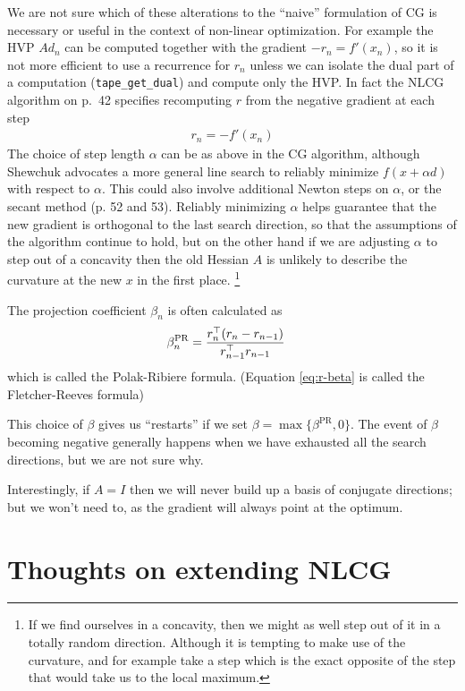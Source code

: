 \documentclass[11pt]{article}
\newcommand{\T}{\top}
\renewcommand{\(}{\left(}
\renewcommand{\)}{\right)}
\begin{document}
We are not sure which of these alterations to the ``naive''
formulation of CG is necessary or useful in the context of non-linear
optimization. For example the HVP $A d_n$ can be computed together with
the gradient $-r_n=f'(x_n)$, so it is not more efficient to use a
recurrence for $r_n$ unless we can isolate the dual part of a
computation (\verb|tape_get_dual|) and compute only the HVP. In fact
the NLCG algorithm on p.~42 specifies recomputing $r$ from the
negative gradient at each step
\begin{align}
r_n = -f'(x_n)
\end{align}
The choice of step length $\alpha$ can be as above in the CG
algorithm, although Shewchuk advocates a more general line search to
reliably minimize $f(x+\alpha d)$ with respect to $\alpha$. This could
also involve additional Newton steps on $\alpha$, or the secant method
(p. 52 and 53). Reliably minimizing $\alpha$ helps guarantee that the
new gradient is orthogonal to the last search direction, so that the
assumptions of the algorithm continue to hold, but on the other hand
if we are adjusting $\alpha$ to step out of a concavity then the old
Hessian $A$ is unlikely to describe the curvature at the new $x$ in
the first place. \footnote{If we find ourselves in a concavity, then
we might as well step out of it in a totally random direction.
Although it is tempting to make use of the curvature, and for example
take a step which is the exact opposite of the step that would take us
to the local maximum.}

\newcommand{\betapr}{\beta^{\mathrm{PR}}}
The projection coefficient $\beta_n$ is often calculated as
\begin{align}
\betapr_n &= {r_n^\T (r_n-r_{n-1}) \over r_{n-1}^\T r_{n-1}}
\end{align}
which is called the Polak-Ribiere formula. (Equation \ref{eq:r-beta}
is called the Fletcher-Reeves formula)

This choice of $\beta$ gives us ``restarts'' if we set
$\beta=\max\{\betapr,0\}$. The event of $\beta$ becoming negative
generally happens when we have exhausted all the search directions,
but we are not sure why.

Interestingly, if $A=I$ then we will never build up a basis of
conjugate directions; but we won't need to, as the gradient will
always point at the optimum.

\section{Thoughts on extending NLCG}
\end{document}
